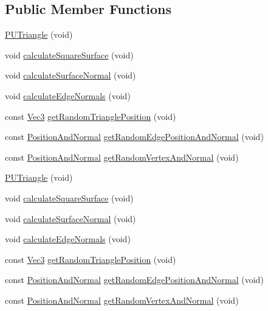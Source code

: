\subsection*{Public Member Functions}
\begin{DoxyCompactItemize}
\item 
\hyperlink{classPUTriangle_a81d7cf128bbfe1887b0acf0268f4b31d}{P\+U\+Triangle} (void)
\item 
void \hyperlink{classPUTriangle_a346b241c7794e565c33876f0dded6d46}{calculate\+Square\+Surface} (void)
\item 
void \hyperlink{classPUTriangle_a7527b8e00cead35dbddddd5d2902f2ac}{calculate\+Surface\+Normal} (void)
\item 
void \hyperlink{classPUTriangle_a29ed7c93b87e3b348057d30c088157b2}{calculate\+Edge\+Normals} (void)
\item 
const \hyperlink{classVec3}{Vec3} \hyperlink{classPUTriangle_a76d5ffffbe96de214ca5dd8b61d28055}{get\+Random\+Triangle\+Position} (void)
\item 
const \hyperlink{structPUTriangle_1_1PositionAndNormal}{Position\+And\+Normal} \hyperlink{classPUTriangle_a623e3c54b137ac249b9c3f1b1611eed7}{get\+Random\+Edge\+Position\+And\+Normal} (void)
\item 
const \hyperlink{structPUTriangle_1_1PositionAndNormal}{Position\+And\+Normal} \hyperlink{classPUTriangle_a8a60cfc73a7b01ae00aa6380d8d3332f}{get\+Random\+Vertex\+And\+Normal} (void)
\item 
\hyperlink{classPUTriangle_a81d7cf128bbfe1887b0acf0268f4b31d}{P\+U\+Triangle} (void)
\item 
void \hyperlink{classPUTriangle_a346b241c7794e565c33876f0dded6d46}{calculate\+Square\+Surface} (void)
\item 
void \hyperlink{classPUTriangle_a7527b8e00cead35dbddddd5d2902f2ac}{calculate\+Surface\+Normal} (void)
\item 
void \hyperlink{classPUTriangle_a29ed7c93b87e3b348057d30c088157b2}{calculate\+Edge\+Normals} (void)
\item 
const \hyperlink{classVec3}{Vec3} \hyperlink{classPUTriangle_a76d5ffffbe96de214ca5dd8b61d28055}{get\+Random\+Triangle\+Position} (void)
\item 
const \hyperlink{structPUTriangle_1_1PositionAndNormal}{Position\+And\+Normal} \hyperlink{classPUTriangle_af9abade0c279f7eab45fc20ab3e9d9ee}{get\+Random\+Edge\+Position\+And\+Normal} (void)
\item 
const \hyperlink{structPUTriangle_1_1PositionAndNormal}{Position\+And\+Normal} \hyperlink{classPUTriangle_a8458379215dcaf49c973ac9c0fa2bf27}{get\+Random\+Vertex\+And\+Normal} (void)
\end{DoxyCompactItemize}
